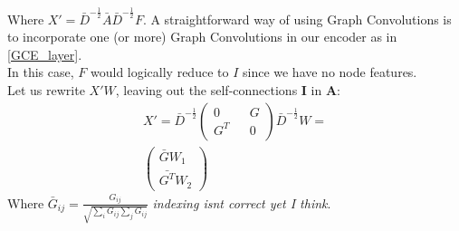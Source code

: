 \documentclass{report}
\begin{document}
\begin{appendices}
	Where $X' = \bar{D}^{-\frac{1}{2}}\bar{A}\bar{D}^{-\frac{1}{2}}F$. A straightforward way of using Graph Convolutions is to incorporate one (or more) Graph Convolutions in our encoder as in \ref{GCE_layer}. \\ In this case, $F$ would logically reduce to $I$ since we have no node features. \\
	Let us rewrite $X'W$, leaving out the self-connections $\mathbf{I}$ in $\mathbf{A}$: 
	\begin{align}
	X' = \bar{D}^{-\frac{1}{2}}
	\left( \begin{matrix} 
	0 && G \\
	G^T && 0
	\end{matrix} \right) \bar{D}^{-\frac{1}{2}}W = \\
	\left(\begin{matrix}
	\bar{G}W_1 \\
	\bar{G^T}W_2
	\end{matrix}\right)\label{highlow}  
	\end{align}
	Where $\bar{G}_{ij} = 
	\frac{G_{ij}}{\sqrt{\sum_i G_{ij} \sum_{j} G_{ij}}}$ \textit{indexing isnt correct yet I think}.
	

\end{appendices}
\end{document}

